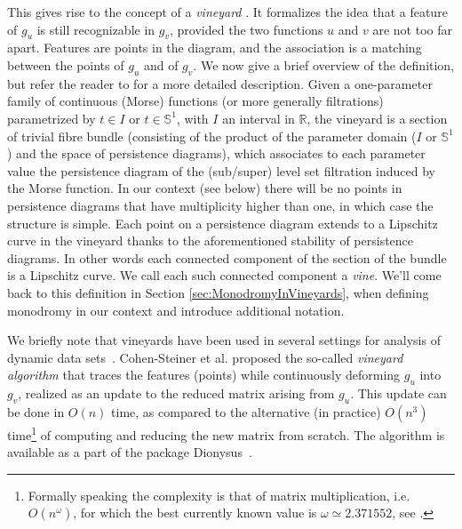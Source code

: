 \documentclass[twoside,leqno]{article}
\begin{document}
This gives rise to the concept of a \emph{vineyard} \cite{CohenSteiner2006,turner2023representing}. It formalizes the idea that a feature of $g_u$ is still recognizable in $g_v$, provided the two functions $u$ and $v$ are not too far apart.
Features are points in the diagram, and the association is a matching between the points of $g_u$ and of $g_v$.  
We now give a brief overview of the definition, but refer the reader to \cite{turner2023representing} for a more detailed description. 
Given a one-parameter family of continuous (Morse) functions (or more generally filtrations) parametrized by $t\in I$ or $t \in \mathbb{S}^1$, with $I$ an interval in $\mathbb{R}$, the vineyard is a section of trivial fibre bundle (consisting of the product of the parameter domain ($I$ or $\mathbb{S}^1$) and the space of persistence diagrams), which associates to each parameter value the persistence diagram of the (sub/super) level set filtration induced by the Morse function. 
In our context (see below) there will be no points in persistence diagrams that have multiplicity higher than one, in which case the structure is simple. Each point on a persistence diagram extends to a Lipschitz curve in the vineyard thanks to the aforementioned stability of persistence diagrams.  In other words each connected component of the section of the bundle is a Lipschitz curve. We call each such connected component a \emph{vine}. We'll come back to this definition in Section \ref{sec:MonodromyInVineyards}, when defining monodromy in our context and introduce additional notation. 
%

%
We briefly note that vineyards have been used in several settings for analysis of dynamic data sets~\cite{Yoo2016,Carriere2020,Xian2022,Cipriani2023}.  
Cohen-Steiner et al. \cite{CohenSteiner2006} proposed the so-called \emph{vineyard algorithm} that traces the features (points) while continuously deforming $g_u$ into $g_v$, realized as an update to the reduced matrix arising from $g_u$.
This update can be done in $O(n)$ time, as compared to the alternative (in practice) $O(n^3)$ time\footnote{Formally speaking the complexity is that of matrix multiplication, i.e. $O(n^\omega)$, for which the best currently known value is $\omega\simeq 2.371552$, see \cite{williams2024new}. } of computing and reducing the new matrix from scratch.  The algorithm is available as a part of the package Dionysus~\cite{dionysus}.



%
%
%

%
%
\end{document}
